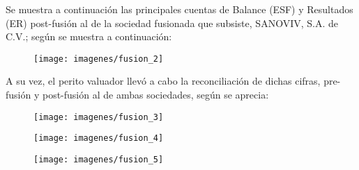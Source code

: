 Se muestra a continuaci\'on las principales cuentas de Balance (ESF) y Resultados (ER) post-fusi\'on al \fechaValoresCorto de la sociedad fusionada que subsiste, \textcolor{principal}{SANOVIV, S.A. de C.V.}; seg\'un se muestra a continuaci\'on:

\begin{figure}[H]
\centering
\texttt{[image: imagenes/fusion\_2]}
\end{figure}

A su vez, el perito valuador llev\'o a cabo la reconciliaci\'on de dichas cifras, pre-fusi\'on y post-fusi\'on al \fechaValoreCorto de ambas sociedades, seg\'un se aprecia:

\begin{figure}[H]
\centering
\texttt{[image: imagenes/fusion\_3]}
\end{figure}

\begin{figure}[H]
\centering
\texttt{[image: imagenes/fusion\_4]}
\end{figure}

\begin{figure}[H]
\centering
\texttt{[image: imagenes/fusion\_5]}
\end{figure}





